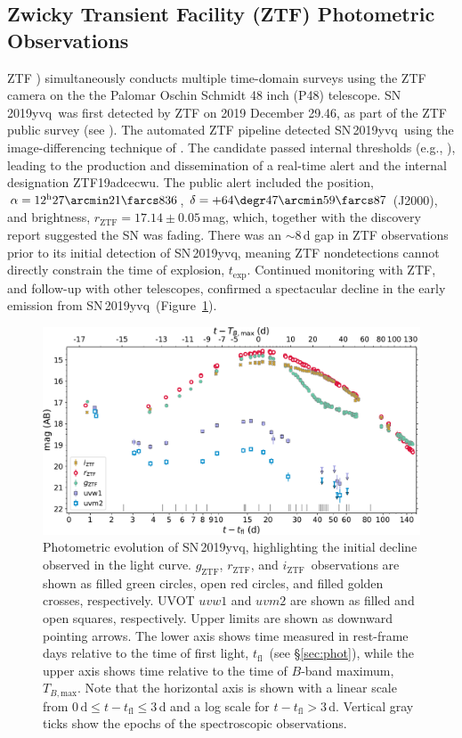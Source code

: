 \documentclass[twocolumn]{aastex63}
\newcommand{\rztf}{$r_\mathrm{ZTF}$}
\newcommand{\gztf}{$g_\mathrm{ZTF}$}
\newcommand{\iztf}{$i_\mathrm{ZTF}$}
\newcommand{\tfl}{$t_\mathrm{fl}$}
\newcommand{\tbmax}{$T_{B,\mathrm{max}}$}
\newcommand{\sn}{SN\,2019yvq}
\begin{document}
\subsection{Zwicky Transient Facility (ZTF) Photometric Observations}



ZTF \citep{Bellm19,Graham19,Dekany20}) simultaneously conducts multiple
time-domain surveys using the ZTF camera on the the Palomar Oschin Schmidt 48
inch (P48) telescope. \sn\ was first detected by ZTF on 2019 December 29.46,
as part of the ZTF public survey (see \citealt{Bellm19a}). The automated ZTF
pipeline \citep{Masci19} detected \sn\ using the image-differencing technique
of \citet{Zackay16}. The candidate passed internal thresholds (e.g.,
\citealt{Mahabal19}), leading to the production and dissemination of a
real-time alert \citep{Patterson19} and the internal designation ZTF19adcecwu.
The public alert included the position, $\alpha =
12^{\mathrm{h}}27\arcmin21\farcs836$, $\delta = +64\degr47\arcmin59\farcs87$
(J2000), and brightness, \rztf$ = 17.14\pm0.05$\,mag, which, together with the
\citet{Itagaki19} discovery report suggested the SN was fading. There was an
$\sim$8\,d gap in ZTF observations prior to its initial detection of \sn,
meaning ZTF nondetections cannot directly constrain the time of explosion,
$t_\mathrm{exp}$. Continued monitoring with ZTF, and follow-up with other
telescopes, confirmed a spectacular decline in the early emission from \sn\
(Figure~\ref{fig:p48}).

\begin{figure}
    \centering
    \includegraphics[width=6in]{./figures/P48_lc.pdf}
    \caption{Photometric evolution of \sn, highlighting the initial decline
    observed in the light curve. \gztf, \rztf, and \iztf\ observations are
    shown as filled green circles, open red circles, and filled golden
    crosses, respectively. UVOT $uvw1$ and $uvm2$ are shown as filled and open
    squares, respectively. Upper limits are shown as downward pointing arrows.
    The lower axis shows time measured in rest-frame days relative to the time
    of first light, \tfl\ (see \S\ref{sec:phot}), while the upper axis shows
    time relative to the time of $B$-band maximum, \tbmax. Note that the
    horizontal axis is shown with a linear scale from $0\,\mathrm{d} \le t -
    t_\mathrm{fl} \le 3$\,d and a log scale for $t - t_\mathrm{fl} > 3$\,d.
    Vertical gray ticks show the epochs of the spectroscopic observations.}
    \label{fig:p48}
\end{figure}
\end{document}
